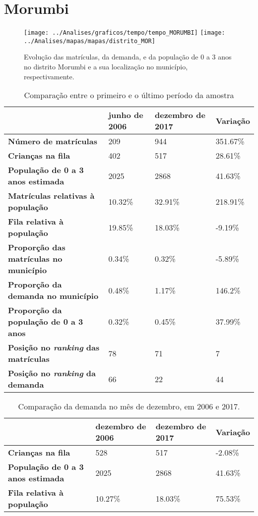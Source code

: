 \section{Morumbi}
\begin{figure}[H]
\centering
\texttt{[image: ../Analises/graficos/tempo/tempo\_MORUMBI]}
\texttt{[image: ../Analises/mapas/mapas/distrito\_MOR]}
\caption{Evolução das matrículas, da demanda, e da população de 0 a 3 anos no distrito Morumbi e a sua localização no município, respectivamente.}
\end{figure}
\begin{table}[H]
\begin{tabular}{l|l|l|l}
\textbf{}                                      & \textbf{junho de 2006}       & \textbf{dezembro de 2017}    & \textbf{Variação} \\ \hline
\textbf{Número de matrículas}                  & 209 & 944 & 351.67\% \\ \hline
\textbf{Crianças na fila}                      & 402 & 517 & 28.61\% \\ \hline
\textbf{População de 0 a 3 anos estimada}      & 2025 & 2868 & 41.63\% \\ \hline
\textbf{Matrículas relativas à população}      & 10.32\% & 32.91\% & 218.91\% \\ \hline
\textbf{Fila relativa à população}             & 19.85\% & 18.03\% & -9.19\% \\ \hline
\textbf{Proporção das matrículas no município} & 0.34\% & 0.32\% & -5.89\% \\ \hline
\textbf{Proporção da demanda no município}     & 0.48\% & 1.17\% & 146.2\% \\ \hline
\textbf{Proporção da população de 0 a 3 anos}  & 0.32\% & 0.45\% & 37.99\% \\ \hline
\textbf{Posição no \textit{ranking} das matrículas}     & 78 & 71 & 7 \\ \hline
\textbf{Posição no \textit{ranking} da demanda}         & 66 & 22 & 44 \\ 
\end{tabular}
\caption{Comparação entre o primeiro e o último período da amostra}
\end{table}
\begin{table}[H]
\begin{tabular}{l|l|l|l}
\textbf{}                                 & \textbf{dezembro de 2006} & \textbf{dezembro de 2017} & \textbf{Variação} \\ \hline
\textbf{Crianças na fila}                      & 528 & 517 & -2.08\% \\ \hline
\textbf{População de 0 a 3 anos estimada}      & 2025 & 2868 & 41.63\% \\ \hline
\textbf{Fila relativa à população}             & 10.27\% & 18.03\% & 75.53\% \\
\end{tabular}
\caption{Comparação da demanda no mês de dezembro, em 2006 e 2017.}
\end{table}
